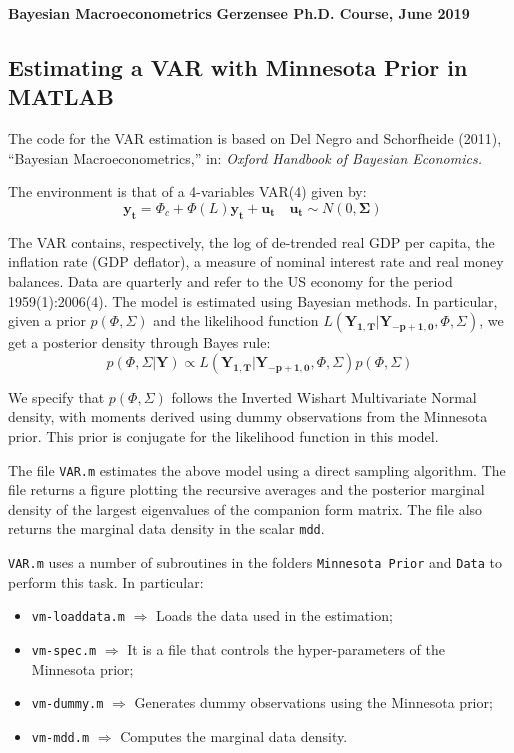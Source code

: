 \documentclass[11pt]{article}
\begin{document}
	\thispagestyle{empty}
	
	{\bf Bayesian Macroeconometrics} \hfill {\bf Gerzensee Ph.D. Course, June 2019}
	
	\vspace*{0.5cm}

\subsection*{Estimating a VAR with Minnesota Prior in MATLAB}

The code for the VAR estimation is based on Del Negro and Schorfheide (2011), ``Bayesian Macroeconometrics,'' in: {\em Oxford Handbook of Bayesian Economics.}

The environment is that of a 4-variables VAR(4) given by:
$$
\mathbf{y_{t}} = \Phi_{c} + \Phi(L)\mathbf{y_{t}} + \mathbf{u_{t}} \quad \mathbf{u_{t}} \sim N(0,\mathbf{\Sigma}) \quad 
$$

The VAR contains, respectively, the log of de-trended real GDP per capita, the inflation rate (GDP deflator), a measure of nominal interest rate and real money balances. Data are quarterly and refer to the US economy for the period 1959(1):2006(4). The model is estimated using Bayesian methods. In particular, given a prior $p(\Phi,\Sigma)$ and the likelihood function $L(\mathbf{Y_{1,T}}|\mathbf{Y_{-p+1,0}},\Phi,\Sigma)$, we get a posterior density through Bayes rule:
$$
p(\Phi,\Sigma|\mathbf{Y}) \propto  L(\mathbf{Y_{1,T}}|\mathbf{Y_{-p+1,0}},\Phi,\Sigma)p(\Phi,\Sigma)
$$

We specify that $p(\Phi,\Sigma)$ follows the Inverted Wishart Multivariate Normal density, with moments derived using dummy observations from the Minnesota prior. This prior is conjugate for the likelihood function in this model. 

The file \texttt{VAR.m} estimates the above model using a direct sampling algorithm. The file returns a figure plotting the recursive averages and the posterior marginal density of the largest eigenvalues of the companion form matrix. The file also returns the marginal data density in the scalar \texttt{mdd}. 

\texttt{VAR.m} uses a number of subroutines in the folders \texttt{Minnesota Prior} and \texttt{Data} to perform this task. In particular:


\begin{itemize}
	\item \texttt{vm-loaddata.m} $\Rightarrow$ Loads the data used in the estimation;
	\item \texttt{vm-spec.m} $\Rightarrow$ It is a file that controls the hyper-parameters of the Minnesota prior;
	\item \texttt{vm-dummy.m} $\Rightarrow$ Generates dummy observations using the Minnesota prior;  
	\item \texttt{vm-mdd.m} $\Rightarrow$ Computes the marginal data density.
\end{itemize}

 
\end{document}
